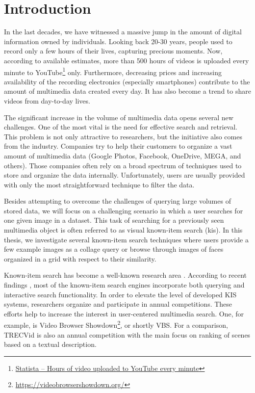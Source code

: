 \chapter*{Introduction}

In the last decades, we have witnessed a massive jump in the amount of digital information owned by individuals. Looking back 20-30 years, people used to record only a few hours of their lives, capturing precious moments. Now, according to available estimates, more than 500 hours of videos is uploaded every minute  to YouTube\footnote{\href{https://www.statista.com/statistics/259477/hours-of-video-uploaded-to-youtube-every-minute/}{Statista -- Hours of video uploaded to YouTube every minute}} only. Furthermore, decreasing prices and increasing availability of the recording electronics (especially smartphones) contribute to the amount of multimedia data created every day. It has also become a trend to share videos from day-to-day lives.

The significant increase in the volume of multimedia data opens several new challenges. One of the most vital is the need for effective search and retrieval. This problem is not only attractive to researchers, but the initiative also comes from the industry. Companies try to help their customers to organize a vast amount of multimedia data (Google Photos, Facebook, OneDrive, MEGA, and others). Those companies often rely on a broad spectrum of techniques used to store and organize the data internally. Unfortunately, users are usually provided with only the most straightforward technique to filter the data.

Besides attempting to overcome the challenges of querying large volumes of stored data, we will focus on a challenging scenario in which a user searches for one given image in a dataset. This task of searching for a previously seen multimedia object is often referred to as visual known-item search (\acrshort{kis}). In this thesis, we investigate several known-item search techniques where users provide a few example images as a collage query or browse through images of faces organized in a grid with respect to their similarity.

Known-item search has become a well-known research area \citep{8352047}. According to recent findings \citep{9037125}, most of the known-item search engines incorporate both querying and interactive search functionality. In order to elevate the level of developed KIS systems, researchers organize and participate in annual competitions. These efforts help to increase the interest in user-centered multimedia search. One, for example, is Video Browser Showdown\footnote{\url{https://videobrowsershowdown.org/}}, or shortly VBS. For a comparison, TRECVid \citep{2019trecvidawad} is also an annual competition with the main focus on ranking of scenes based on a textual description.

